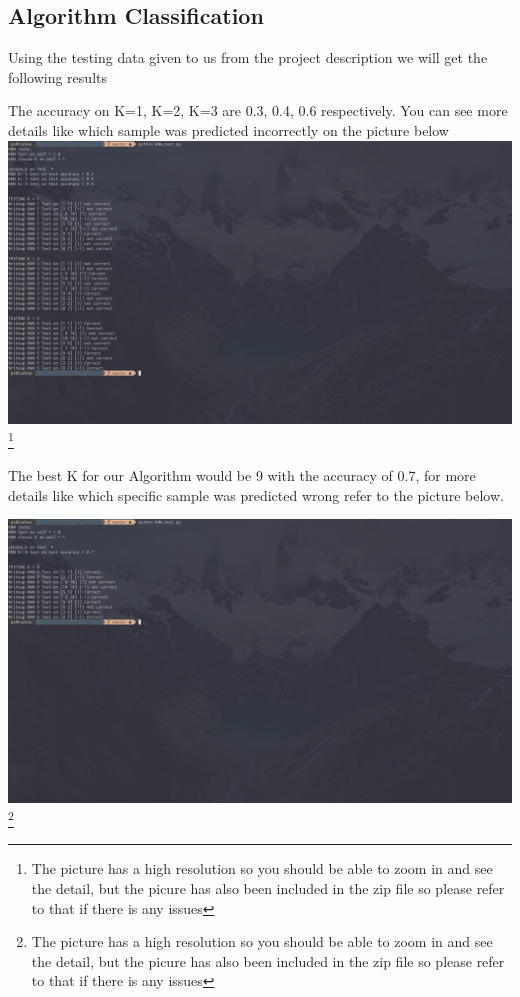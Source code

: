 \documentclass{article}
\begin{document}
	\subsection{Algorithm Classification}

	Using the testing data given to us from the project description we will get the following results
\begin{center}
The accuracy on K=1, K=2, K=3 are 0.3, 0.4, 0.6 respectively. You can see more details like which sample was predicted incorrectly on the picture below
\includegraphics[scale=.24]{KNN.jpg}
	\footnote{The picture has a high resolution so you should be able to zoom in and see the detail, but the picure has also been included in the zip file so please refer to that if there is any issues}

\end{center}
	The best K for our Algorithm would be 9 with the accuracy of 0.7, for more details like which specific sample was predicted wrong refer to the picture below.
	\begin{center}
		\includegraphics[scale=.24]{KNN2.jpg}
		\footnote{The picture has a high resolution so you should be able to zoom in and see the detail, but the picure has also been included in the zip file so please refer to that if there is any issues}

	\end{center}
\end{document}
